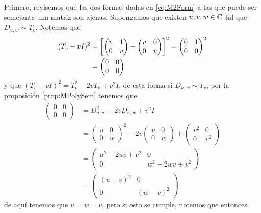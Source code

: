 Primero, revisemos que las dos formas dadas en \eqref{eq:M2Form} a las que puede ser semejante una matriz son ajenas. Supongamos que existen $u,v,w \in \mathbb{C}$ tal que $ D_{u,w} \sim T_v $. Notemos que
\begin{align*}
  (T_v - vI)^2 
    &= \corch{ \begin{pmatrix} v & 1 \\ 0 & v \end{pmatrix} - \begin{pmatrix} v & 0 \\ 0 & v \end{pmatrix} }^2 
     = \begin{pmatrix} 0 & 1 \\ 0 & 0  \end{pmatrix}^2  \\
    &= \begin{pmatrix} 0 & 0 \\ 0 & 0  \end{pmatrix}
\end{align*}
y que $(T_v - vI)^2 = T_v^2 - 2vT_v + v^2 I$, de esta forma si $ D_{u,w} \sim T_v $, por la proposición \ref{prop:MPolySem} tenemos que
\begin{align*}
  \begin{pmatrix} 0 & 0 \\ 0 & 0  \end{pmatrix}
    &= D_{u,w}^2 - 2vD_{u,w} + v^2 I \\
    &= \begin{pmatrix} u & 0 \\ 0 & w \end{pmatrix}^2 - 2v \begin{pmatrix} u & 0 \\ 0 & w \end{pmatrix} + \begin{pmatrix} v^2 & 0 \\ 0 & v^2 \end{pmatrix} \\
    &= \begin{pmatrix} u^2 - 2uv + v^2 & 0 \\ 0 & w^2 - 2wv + v^2 \end{pmatrix} \\
    &= \begin{pmatrix} (u-v)^2 & 0 \\ 0 & (w-v)^2 \end{pmatrix} 
\end{align*}
de aquí tenemos que $u = w = v$, pero si esto se cumple, notemos que entonces
